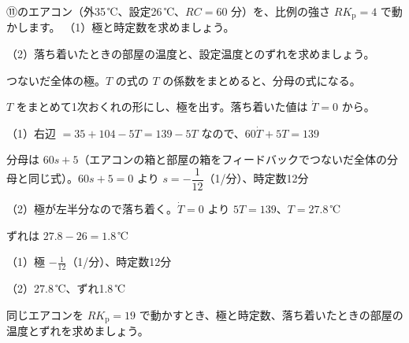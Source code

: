 \begin{reidai}[エアコンの比例制御]
⑪のエアコン（外35\,℃、設定26\,℃、$RC=60$ 分）を、比例の強さ $RK_{\mathrm p}=4$ で動かします。
（1）極と時定数を求めましょう。\par
（2）落ち着いたときの部屋の温度と、設定温度とのずれを求めましょう。\par
\kangaekata {}\par
{}\enspace つないだ全体の極。$T$ の式の $T$ の係数をまとめると、分母の式になる。\par
{}\enspace $T$ をまとめて1次おくれの形にし、極を出す。落ち着いた値は $\dot T=0$ から。\par
\shiki\kixjs{}\zw{} （1）右辺 $=35+104-5T=139-5T$ なので、$60\dot T+5T=139$\par
\kixjb 分母は $60s+5$（エアコンの箱と部屋の箱をフィードバックでつないだ全体の分母と同じ式）。$60s+5=0$ より $s=-\dfrac{1}{12}$（1/分）、時定数12分\par
\kixja （2）極が左半分なので落ち着く。$\dot T=0$ より $5T=139$、$T=27.8$\,℃\par
\kixjb ずれは $27.8-26=1.8$\,℃\par
\kotae\kixjs{}\zw{} （1）極 $-\frac{1}{12}$（1/分）、時定数12分\par
\kixja （2）27.8\,℃、ずれ1.8\,℃
\end{reidai}

\begin{jibun}
同じエアコンを $RK_{\mathrm p}=19$ で動かすとき、極と時定数、落ち着いたときの部屋の温度とずれを求めましょう。
\end{jibun}


